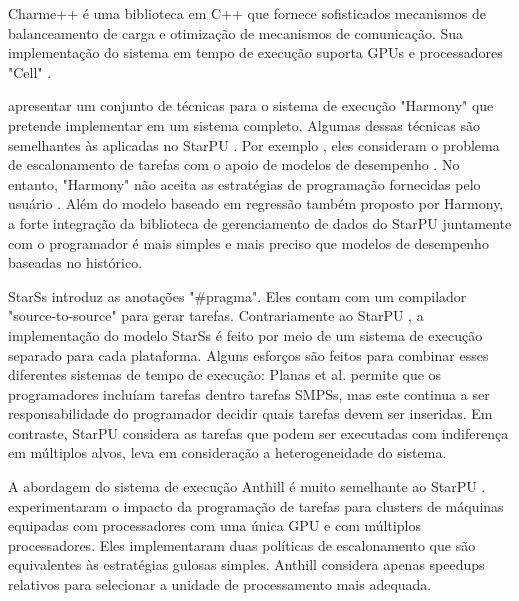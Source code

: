 Charme++\cite{kunzman2006charm++} é uma biblioteca em C++ que fornece sofisticados mecanismos de balanceamento de carga e otimização de mecanismos de comunicação. Sua implementação do sistema em tempo de execução suporta GPUs e processadores "Cell" . 

\cite{harmony} apresentar um conjunto de técnicas para o sistema de execução "Harmony" que pretende implementar em um sistema completo. Algumas dessas técnicas são semelhantes às aplicadas no StarPU . Por exemplo , eles consideram o problema de escalonamento de tarefas com o apoio de modelos de desempenho . No entanto, "Harmony" não aceita as estratégias de programação fornecidas pelo usuário . Além do modelo baseado em regressão também proposto por Harmony, a forte integração da biblioteca de gerenciamento de dados do StarPU juntamente com o programador é mais simples e mais preciso que modelos de desempenho baseadas no histórico. 

StarSs \cite{StarSs} introduz  as anotações "\#pragma". Eles contam com um compilador "source-to-source" para gerar tarefas. Contrariamente ao StarPU , a implementação do modelo StarSs é feito por meio de um sistema de execução separado para cada plataforma. Alguns esforços são feitos para combinar esses diferentes sistemas de tempo de execução: Planas et al. permite que os programadores incluíam tarefas dentro tarefas SMPSs, mas este continua a ser responsabilidade do programador decidir quais tarefas devem ser inseridas. Em contraste, StarPU considera as tarefas que podem ser executadas com indiferença em múltiplos alvos, leva em consideração a heterogeneidade do sistema.

A abordagem do sistema de execução Anthill é muito semelhante ao StarPU . \cite{Anthill} experimentaram o impacto da programação de tarefas para clusters de máquinas equipadas com processadores com uma única GPU e com múltiplos processadores. Eles implementaram duas políticas de escalonamento que são equivalentes às estratégias gulosas simples. Anthill considera apenas speedups relativos para selecionar a unidade de processamento mais adequada.






